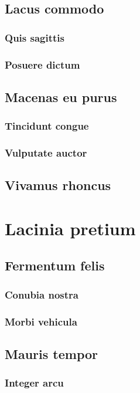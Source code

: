 \subsection{Lacus commodo} \lipsum[5]
\subsubsection{Quis sagittis} \lipsum[6]
\subsubsection{Posuere dictum} \lipsum[7]
\subsection{Macenas eu purus} \lipsum[8]
\subsubsection{Tincidunt congue} \lipsum[9]

\subsubsection{Vulputate auctor} \lipsum[10]
\subsection{Vivamus rhoncus} \lipsum[11-12]

\section{Lacinia pretium} \lipsum[13-14]

\subsection{Fermentum felis} \lipsum[15]
\subsubsection{Conubia nostra} \lipsum[16]
\subsubsection{Morbi vehicula} \lipsum[17]

\subsection{Mauris tempor} \lipsum [18]
\subsubsection{Integer arcu} \lipsum[19]
